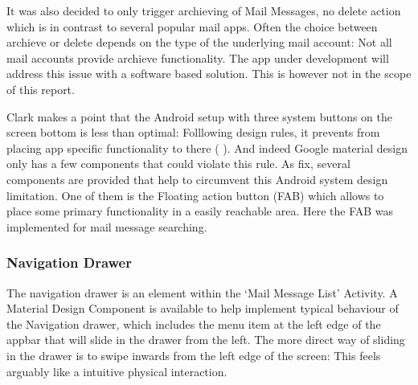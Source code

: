 \documentclass[a4paper,11pt,twoside]{article}
\begin{document}
It was also decided to only trigger archieving of Mail Messages, no delete
action  which is in contrast to several popular mail apps. Often the choice
between archieve  or delete depends on the type of the underlying mail account:
Not all mail accounts provide archieve functionality. The app under development
will address this issue with a software based solution. This is however not
in the scope of this report.

Clark makes a point that the Android setup with three system buttons on the
screen bottom is less than optimal: Folllowing design rules, it prevents from
placing app specific functionality to there  (
\cite[Chapter 1, 'Make Way for the Operating System']{clark2015}).
And indeed Google material design only  has a
few components that could violate this rule. As fix, several components are
provided that help to circumvent this Android system design limitation. One of
them is the Floating action button (FAB) which allows to place some primary
functionality in a easily reachable area. Here the FAB was implemented for mail
message searching.

\subsubsection{Navigation Drawer}
The navigation drawer is an element within the `Mail Message List' Activity. A
Material Design Component is available to help implement typical behaviour of
the Navigation drawer, which includes the menu item at the left edge of the appbar
that will slide in the drawer from the left. The more direct way of
sliding in the drawer is to swipe inwards from the left edge of the screen: This
feels arguably like a intuitive physical interaction.
\end{document}
